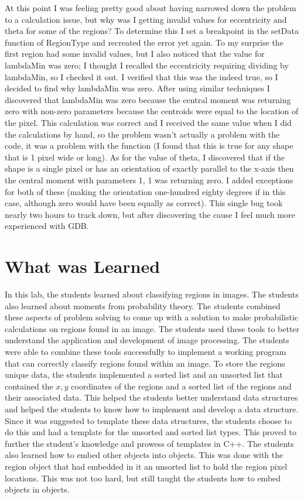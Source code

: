 \documentclass[pdftex, 11pt]{article}
\begin{document}
At this point I was feeling pretty good about having narrowed down the problem to a calculation issue, but why was I
getting invalid values for eccentricity and theta for some of the regions?  To determine this I set a breakpoint in the
setData function of RegionType and recreated the error yet again.  To my surprise the first region had some invalid
values, but I also noticed that the value for lambdaMin was zero; I thought I recalled the eccentricity requiring
dividing by lambdaMin, so I checked it out.  I verified that this was the indeed true, so I decided to find why
lambdaMin was zero.  After using similar techniques I discovered that lambdaMin was zero because the central moment was
returning zero with non-zero parameters because the centroids were equal to the location of the pixel.  This calculation
was correct and I received the same value when I did the calculations by hand, so the problem wasn't actually a problem
with the code, it was a problem with the function (I found that this is true for any shape that is 1 pixel wide or
long).  As for the value of theta, I discovered that if the shape is a single pixel or has an orientation of exactly
parallel to the x-axis then the central moment with parameters 1, 1 was returning zero.  I added exceptions for both of
these (making the orientation one-hundred eighty degrees if in this case, although zero would have been equally as
correct).  This single bug took nearly two hours to track down, but after discovering the cause I feel much more
experienced with GDB.



\section{What was Learned}

In this lab, the students learned about classifying regions in images. The students also learned about moments from
probability theory. The students combined these aspects of problem solving to come up with a solution to make
probabilistic calculations on regions found in an image.  The students used these tools to better understand the
application and development of image processing. The students were able to combine these tools successfully to implement
a working program that can correctly classify regions found within an image. To store the regions unique data, the
students implemented a sorted list and an unsorted list that contained the $x,y$ coordinates of the regions and a sorted
list of the regions and their associated data. This helped the students better understand data structures and helped the
students to know how to implement and develop a data structure. Since it was suggested to template these data
structures, the students choose to do this and had a template for the unsorted and sorted list types. This proved to
further the student's knowledge and prowess of templates in C++.  The students also learned how to embed other objects
into objects. This was done with the region object that had embedded in it an unsorted list to hold the region pixel
locations. This was not too hard, but still taught the students how to embed objects in objects.
\end{document}
